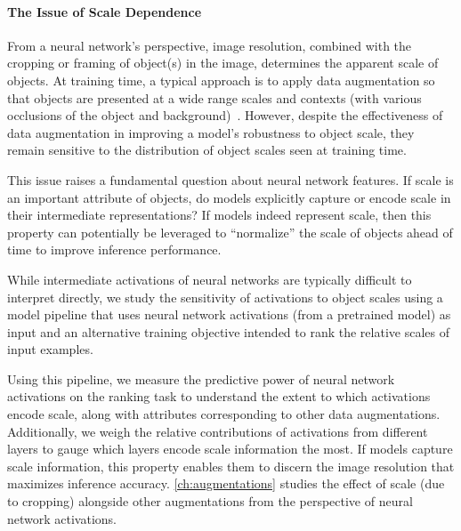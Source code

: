 \paragraph{The Issue of Scale Dependence}
From a neural network's perspective, image resolution, combined with the cropping or framing of object(s) in the image, determines the apparent scale of objects.
At training time, a typical approach is to apply data augmentation so that objects are presented at a wide range scales and contexts (with various occlusions of the object and background)~\cite{krizhevsky2012imagenet}.
However, despite the effectiveness of data augmentation in improving a model's robustness to object scale, they remain sensitive to the distribution of object scales seen at training time.

This issue raises a fundamental question about neural network features.
If scale is an important attribute of objects, do models explicitly capture or encode scale in their intermediate representations?
If models indeed represent scale, then this property can potentially be leveraged to ``normalize'' the scale of objects ahead of time to improve inference performance.

While intermediate activations of neural networks are typically difficult to interpret directly, we study the sensitivity of activations to object scales using a model pipeline that uses neural network activations (from a pretrained model) as input and an alternative training objective intended to rank the relative scales of input examples.

Using this pipeline, we measure the predictive power of neural network activations on the ranking task to understand the extent to which activations encode scale, along with attributes corresponding to other data augmentations.
Additionally, we weigh the relative contributions of activations from different layers to gauge which layers encode scale information the most.
If models capture scale information, this property enables them to discern the image resolution that maximizes inference accuracy.
\autoref{ch:augmentations} studies the effect of scale (due to cropping) alongside other augmentations from the perspective of neural network activations.

